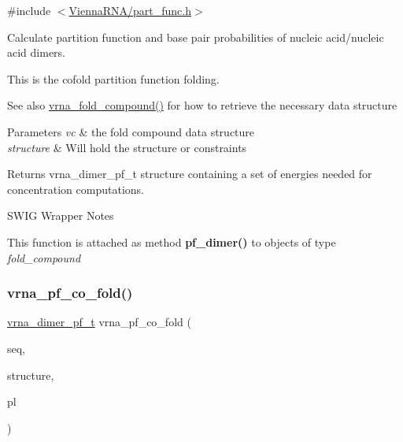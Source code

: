 {\ttfamily \#include $<$\mbox{\hyperlink{part__func_8h}{Vienna\+R\+N\+A/part\+\_\+func.\+h}}$>$}



Calculate partition function and base pair probabilities of nucleic acid/nucleic acid dimers. 

This is the cofold partition function folding.

\begin{DoxySeeAlso}{See also}
\mbox{\hyperlink{group__fold__compound_ga6601d994ba32b11511b36f68b08403be}{vrna\+\_\+fold\+\_\+compound()}} for how to retrieve the necessary data structure
\end{DoxySeeAlso}

\begin{DoxyParams}{Parameters}
{\em vc} & the fold compound data structure \\
\hline
{\em structure} & Will hold the structure or constraints \\
\hline
\end{DoxyParams}
\begin{DoxyReturn}{Returns}
vrna\+\_\+dimer\+\_\+pf\+\_\+t structure containing a set of energies needed for concentration computations.
\end{DoxyReturn}
\begin{DoxyRefDesc}{S\+W\+I\+G Wrapper Notes}
\item[\mbox{\hyperlink{wrappers__wrappers000084}{S\+W\+I\+G Wrapper Notes}}]This function is attached as method {\bfseries pf\+\_\+dimer()} to objects of type {\itshape fold\+\_\+compound} \end{DoxyRefDesc}
\mbox{\label{group__pf__cofold_gaf2b846f7ac382686f35ff7b9202fdd5c}} 
\subsubsection{\texorpdfstring{vrna\+\_\+pf\+\_\+co\+\_\+fold()}{vrna\_pf\_co\_fold()}}
{\footnotesize\ttfamily \mbox{\hyperlink{group__pf__cofold_ga444df1587c9a2ca15b8eb25188f629c3}{vrna\+\_\+dimer\+\_\+pf\+\_\+t}} vrna\+\_\+pf\+\_\+co\+\_\+fold (\begin{DoxyParamCaption}\item[{const char $\ast$}]{seq,  }\item[{char $\ast$}]{structure,  }\item[{\mbox{\hyperlink{group__struct__utils_gab9ac98ab55ded9fb90043b024b915aca}{vrna\+\_\+ep\+\_\+t}} $\ast$$\ast$}]{pl }\end{DoxyParamCaption})}



